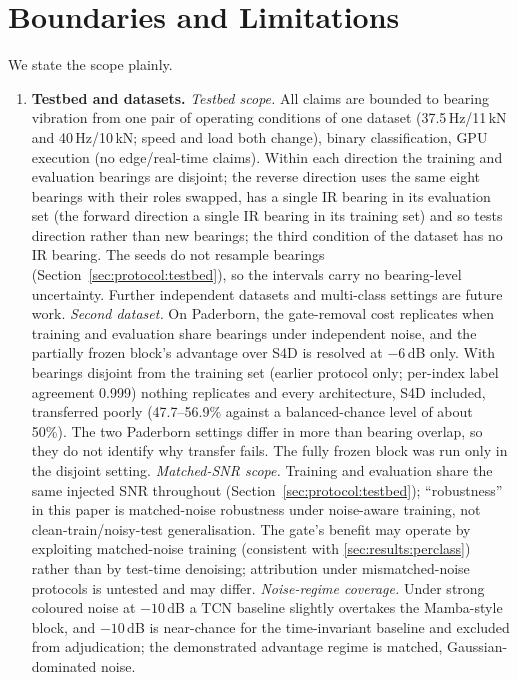 \section{Boundaries and Limitations}
\label{sec:boundaries}

We state the scope plainly.

\begin{enumerate}
\item \textbf{Testbed and datasets.} \emph{Testbed scope.} All claims are bounded to bearing vibration from one pair of operating conditions of one dataset (37.5\,Hz/11\,kN and 40\,Hz/10\,kN; speed and load both change), binary classification, GPU execution (no edge/real-time claims). Within each direction the training and evaluation bearings are disjoint; the reverse direction uses the same eight bearings with their roles swapped, has a single IR bearing in its evaluation set (the forward direction a single IR bearing in its training set) and so tests direction rather than new bearings; the third condition of the dataset has no IR bearing. The seeds do not resample bearings (Section~\ref{sec:protocol:testbed}), so the intervals carry no bearing-level uncertainty. Further independent datasets and multi-class settings are future work. \emph{Second dataset.} On Paderborn, the gate-removal cost replicates when training and evaluation share bearings under independent noise, and the partially frozen block's advantage over S4D is resolved at $-6$\,dB only. With bearings disjoint from the training set (earlier protocol only; per-index label agreement 0.999) nothing replicates and every architecture, S4D included, transferred poorly (47.7--56.9\% against a balanced-chance level of about 50\%). The two Paderborn settings differ in more than bearing overlap, so they do not identify why transfer fails. The fully frozen block was run only in the disjoint setting. \emph{Matched-SNR scope.} Training and evaluation share the same injected SNR throughout (Section~\ref{sec:protocol:testbed}); ``robustness'' in this paper is matched-noise robustness under noise-aware training, not clean-train/noisy-test generalisation. The gate's benefit may operate by exploiting matched-noise training (consistent with \ref{sec:results:perclass}) rather than by test-time denoising; attribution under mismatched-noise protocols is untested and may differ. \emph{Noise-regime coverage.} Under strong coloured noise at $-10$\,dB a TCN baseline slightly overtakes the Mamba-style block, and $-10$\,dB is near-chance for the time-invariant baseline and excluded from adjudication; the demonstrated advantage regime is matched, Gaussian-dominated noise.

\end{enumerate}
